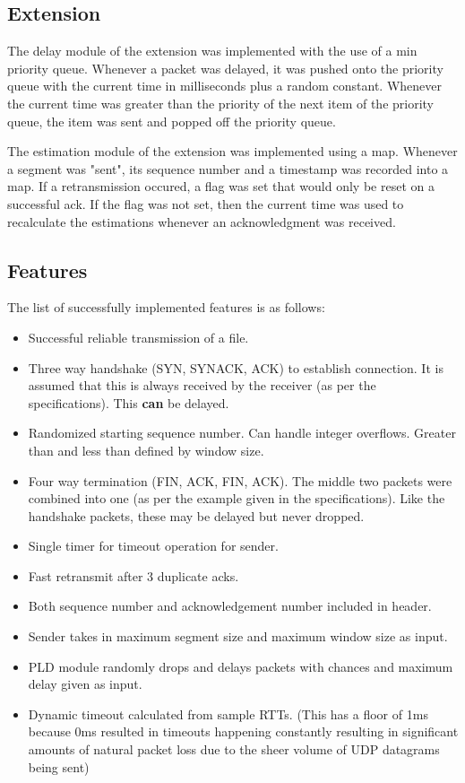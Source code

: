 \documentclass[a4paper]{article}
\begin{document}
\subsection{Extension}
The delay module of the extension was implemented with the use of a min priority queue. Whenever a packet was delayed, it was 
pushed onto the priority queue with the current time in milliseconds plus a random constant. Whenever the current time was greater
than the priority of the next item of the priority queue, the item was sent and popped off the priority queue.

The estimation module of the extension was implemented using a map. Whenever a segment was "sent", its sequence number and a 
timestamp was recorded into a map. If a retransmission occured, a flag was set that would only be reset on a successful ack.
If the flag was not set, then the current time was used to recalculate the estimations whenever an acknowledgment was received.

\subsection{Features}
The list of successfully implemented features is as follows:
\begin{itemize}
	\item Successful reliable transmission of a file.
	\item Three way handshake (SYN, SYNACK, ACK) to establish connection. It is assumed that this is always received by the
		receiver (as per the specifications). This \textbf{can} be delayed.
	\item Randomized starting sequence number. Can handle integer overflows. Greater than and less than defined by window size.
	\item Four way termination (FIN, ACK, FIN, ACK). The middle two packets were combined into one (as per the example given in
		the specifications). Like the handshake packets, these may be delayed but never dropped.
	\item Single timer for timeout operation for sender.
	\item Fast retransmit after 3 duplicate acks.
	\item Both sequence number and acknowledgement number included in header.
	\item Sender takes in maximum segment size and maximum window size as input.
	\item PLD module randomly drops and delays packets with chances and maximum delay given as input.
	\item Dynamic timeout calculated from sample RTTs. (This has a floor of 1ms because 0ms resulted in timeouts happening
		constantly resulting in significant amounts of natural packet loss due to the sheer volume of UDP datagrams being sent)
\end{itemize}
\end{document}
